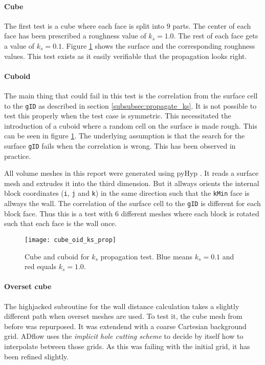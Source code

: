 \paragraph{Cube}
The first test is a cube where each face is split into 9 parts. The center of
each face has been prescribed a roughness value of $k_{s} = 1.0$. The rest of
each face gets a value of $k_{s} = 0.1$. Figure \ref{fig:cube_oid_ks_prop} shows
the surface and the corresponding roughness values. This test exists as it easily
verifiable that the propagation looks right.

\paragraph{Cuboid}
The main thing that could fail in this test is the correlation from the surface
cell to the \texttt{gID} as described in section \ref{subsubsec:propagate_ks}.
It is not possible to test this properly when the test case is symmetric. This
necessitated the introduction of a cuboid where a random cell on the surface is
made rough. This can be seen in figure \ref{fig:cube_oid_ks_prop}. The
underlying assumption is that the search for the surface \texttt{gID} fails when
the correlation is wrong. This has been observed in practice.

All volume meshes in this report were generated using pyHyp \cite{Secco2021}. It
reads a surface mesh and extrudes it into the third dimension. But it allways
orients the internal block coordinates (\texttt{i}, \texttt{j} and \texttt{k})
in the same direction such that the \texttt{kMin} face is allways the wall. The
correlation of the surface cell to the \texttt{gID} is different for each block
face. Thus this is a test with 6 different meshes where each block is rotated
such that each face is the wall once.


\begin{figure}[H] \centering
\texttt{[image: cube\_oid\_ks\_prop]}
    \caption{Cube and cuboid for $k_{s}$ propagation test. Blue means
$k_{s} = 0.1$ and red equals $k_{s} =1.0$.}
    \label{fig:cube_oid_ks_prop}
\end{figure}

\paragraph{Overset cube}
The highjacked subroutine for the wall distance calculation takes a slightly
different path when overset meshes are used. To test it, the cube mesh from
before was repurposed. It was extendend with a coarse Cartesian  background
grid.  ADflow uses the \textit{implicit hole cutting scheme} to decide by itself
how to interpolate between those grids. As this was failing with the initial
grid, it has been refined slightly.

